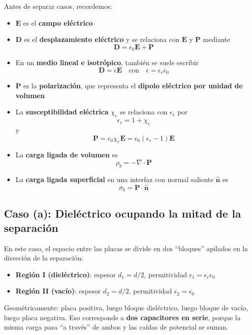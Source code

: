 \documentclass{article}
\begin{document}
Antes de separar casos, recordemos:
\begin{itemize}
  \item $\mathbf{E}$ es el \textbf{campo eléctrico}
  \item $\mathbf{D}$ es el \textbf{desplazamiento eléctrico} y se relaciona con $\mathbf{E}$ y $\mathbf{P}$ mediante
    \[
      \mathbf{D} = \epsilon_{0}\mathbf{E} + \mathbf{P}
    \]
  \item En un \textbf{medio lineal e isotrópico}, también se suele escribir
    \[
      \mathbf{D} = \epsilon \mathbf{E}
      \quad\text{con}\quad
      \epsilon = \epsilon_{r}\epsilon_{0}
    \]
  \item $\mathbf{P}$ es la \textbf{polarización}, que representa el \textbf{dipolo eléctrico por unidad de volumen}
  \item La \textbf{susceptibilidad eléctrica} $\chi_{e}$ se relaciona con $\epsilon_{r}$ por
    \[
      \epsilon_{r} = 1 + \chi_{e}
    \]
    y
    \[
      \mathbf{P} = \epsilon_{0}\chi_{e}\mathbf{E}
      = \epsilon_{0}(\epsilon_{r} - 1)\mathbf{E}
    \]
  \item La \textbf{carga ligada de volumen} es
    \[
      \rho_{b} = -\nabla\cdot\mathbf{P}
    \]
  \item La \textbf{carga ligada superficial} en una interfaz con normal saliente $\hat{\mathbf{n}}$ es
    \[
      \sigma_{b} = \mathbf{P}\cdot\hat{\mathbf{n}}
    \]
\end{itemize}

\subsection*{Caso (a): Dieléctrico ocupando la mitad de la separación}

En este caso, el espacio entre las placas se divide en dos “bloques” apilados en la dirección de la separación:

\begin{itemize}
  \item \textbf{Región I (dieléctrico)}: espesor $d_{1} = d/2$, permitividad $\epsilon_{1} = \epsilon_{r}\epsilon_{0}$
  \item \textbf{Región II (vacío)}: espesor $d_{2} = d/2$, permitividad $\epsilon_{2} = \epsilon_{0}$
\end{itemize}

Geométricamente: placa positiva, luego bloque dieléctrico, luego bloque de vacío, luego placa negativa.  
Eso corresponde a \textbf{dos capacitores en serie}, porque la misma carga pasa “a través” de ambos y las caídas de potencial se suman.
\end{document}
